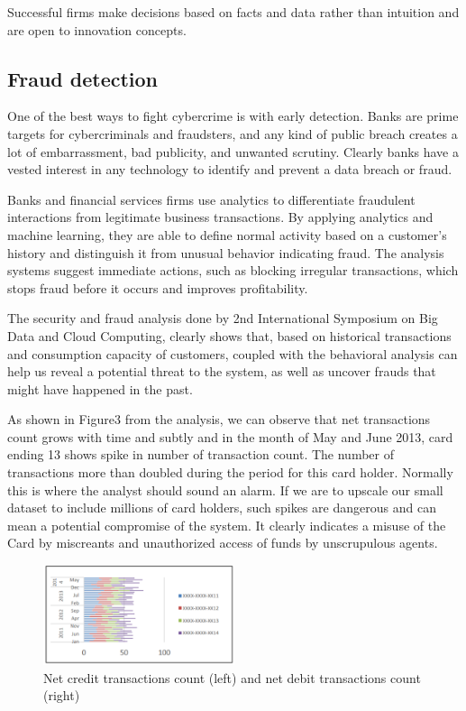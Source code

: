 \documentclass[sigconf]{acmart}
\begin{document}
Successful firms make decisions based on facts and data rather than intuition and are open to innovation concepts. 

\subsection{Fraud detection}
One of the best ways to fight cybercrime is with early detection. Banks are prime targets for cybercriminals and fraudsters, and any kind of public breach creates a lot of embarrassment, bad publicity, and unwanted scrutiny. Clearly banks have a vested interest in any technology to identify and prevent a data breach or fraud\cite{the-top-5-trends-for-big-data-in-financial-services}.

Banks and financial services firms use analytics to differentiate fraudulent interactions from legitimate business transactions. By applying analytics and machine learning, they are able to define normal activity based on a customer's history and distinguish it from unusual behavior indicating fraud. The analysis systems suggest immediate actions, such as blocking irregular transactions, which stops fraud before it occurs and improves profitability\cite{5-big-data-use-cases-in-banking-and-financial-services}.

The security and fraud analysis done by 2nd International Symposium on Big Data and Cloud Computing, clearly shows that, based on historical transactions and consumption capacity of customers, coupled with the behavioral analysis can help us reveal a potential threat to the system, as well as uncover frauds that might have happened in the past\cite{bigdata-banking}. 

As shown in Figure3 from the analysis, we can observe that net transactions count grows with time and subtly and in the month of May and June 2013, card ending 13 shows spike in number of transaction count. The number of transactions more than doubled during the period for this card holder. Normally this is where the analyst should sound an alarm. If we are to upscale our small dataset to include millions of card holders, such spikes are dangerous and can mean a potential compromise of the system. It clearly indicates a misuse of the Card by miscreants and unauthorized access of funds by unscrupulous agents.

\begin{figure}
  \centering
  \includegraphics[width=0.5\textwidth]{images/Figure3.png}
  \caption{Net credit transactions count (left) and net debit transactions count (right) 
  \cite{bigdata-banking}}
  \label{fig:Figure3} 
\end{figure}
\end{document}

